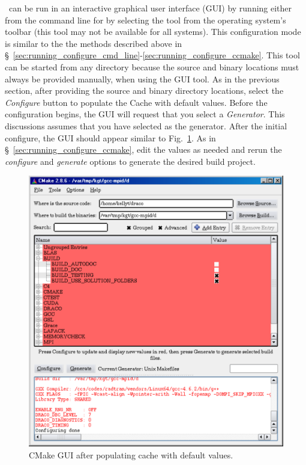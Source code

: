 \cmake\ can be run in an interactive graphical user interface (GUI) by running  either from the command line for by selecting the tool from the operating system's toolbar (this tool may not be available for all systems).  This configuration mode is similar to the the methods described above in \S~\ref{sec:running_configure_cmd_line}-\ref{sec:running_configure_ccmake}.  This tool can be started from any directory because the source and binary locations must always be provided manually, when using the GUI tool.  As in the previous section, after providing the source and binary directory locations, select the {\it Configure} button to populate the Cache with default values.  Before the configuration begins, the GUI will request that you select a {\it Generator}.  This discussions assumes that you have selected  as the generator.  After the initial configure, the GUI should appear similar to Fig.~\ref{fig:cmakegui_defaults}.  As in \S~\ref{sec:running_configure_ccmake}, edit the values as needed and rerun the {\it configure} and {\it generate} options to generate the desired build project.
%
\begin{figure}
  \centerline{\includegraphics[angle=0,width=5.5in]{fig/cmakegui_defaults}}
  \caption{CMake GUI after populating cache with default values.}
  \label{fig:cmakegui_defaults}
\end{figure}
%

